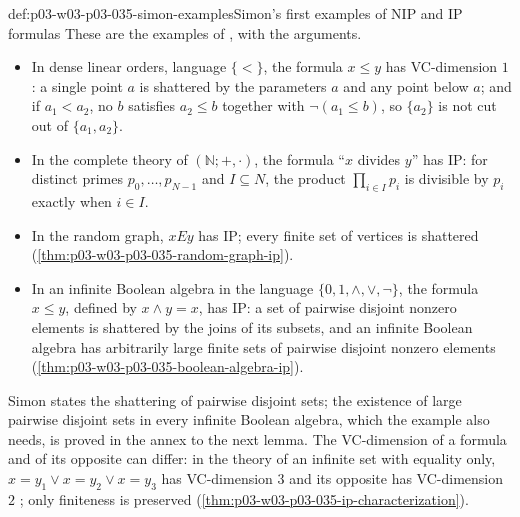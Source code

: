 \begin{hbexample}{def:p03-w03-p03-035-simon-examples}{Simon's first examples of NIP and IP formulas}
These are the examples of \cite[Example~2.4, p.~14]{Simon2015GuideManuscript},
with the arguments.
\begin{itemize}
  \item In dense linear orders, language \(\{<\}\), the formula
        \(x\leq y\) has VC-dimension \(1\): a single point \(a\) is
        shattered by the parameters \(a\) and any point below \(a\); and if
        \(a_1<a_2\), no \(b\) satisfies \(a_2\leq b\) together with
        \(\neg(a_1\leq b)\), so \(\{a_2\}\) is not cut out of
        \(\{a_1,a_2\}\).
  \item In the complete theory of \((\mathbb N;+,\cdot)\), the formula
        ``\(x\) divides \(y\)'' has IP: for distinct primes
        \(p_0,\ldots,p_{N-1}\) and \(I\subseteq N\), the product
        \(\prod_{i\in I}p_i\) is divisible by \(p_i\) exactly when \(i\in I\).
  \item In the random graph, \(xEy\) has IP; every finite set of vertices is
        shattered (\cref{thm:p03-w03-p03-035-random-graph-ip}).
  \item In an infinite Boolean algebra in the language
        \(\{0,1,\wedge,\vee,\neg\}\), the formula \(x\leq y\), defined by
        \(x\wedge y=x\), has IP: a set of pairwise disjoint nonzero elements
        is shattered by the joins of its subsets, and an infinite Boolean
        algebra has arbitrarily large finite sets of pairwise disjoint
        nonzero elements (\cref{thm:p03-w03-p03-035-boolean-algebra-ip}).
\end{itemize}
Simon states the shattering of pairwise disjoint sets; the existence of
large pairwise disjoint sets in every infinite Boolean algebra, which the
example also needs, is proved in the annex to the next lemma.  The VC-dimension of a
formula and of its opposite can differ: in the theory of an infinite set
with equality only, \(x=y_1\vee x=y_2\vee x=y_3\) has VC-dimension \(3\)
and its opposite has VC-dimension \(2\)
\cite[Remark~2.6, pp.~14--15]{Simon2015GuideManuscript}; only finiteness is
preserved (\cref{thm:p03-w03-p03-035-ip-characterization}).
\end{hbexample}

